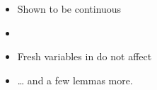 \documentclass{beamer}
\begin{document}
\begin{frame}
\begin{itemize}
\item Shown to be continuous
\item {}
\item Fresh variables in \isa{\isasymrho} do not affect 
\item {\ldots} and a few lemmas more.
\end{itemize}
\end{frame}
\end{document}
